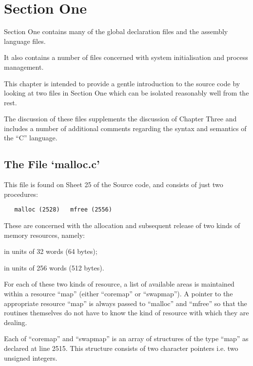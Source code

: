 %
%
\section*{Section One}

{\sf Section One contains many of the global declaration
files and the assembly language files.

It also contains a number of files concerned with
system initialisation and process management.}



This chapter is intended to provide a
gentle introduction to the source code
by looking at two files in Section One
which can be isolated reasonably well
from the rest.


The discussion of these files supplements the discussion of Chapter Three
and includes a number of additional
comments regarding the syntax and
semantics of the ``C'' language.


\subsection{The File `malloc.c'}

This file is found on Sheet 25 of the
Source code, and consists of just two
procedures:

\begin{verbatim}
   malloc (2528)   mfree (2556)
\end{verbatim}


These are concerned with the allocation
and subsequent release of two kinds of
memory resources, namely:

\bd
\item[main memory] in units of 32 words (64 bytes);

\item[disk swap area] in units of 256 words (512 bytes).
\ed

For each of these two kinds of
resource, a list of available areas is
maintained within a resource ``map''
(either ``coremap'' or ``swapmap''). A
pointer to the appropriate resource
``map'' is always passed to ``malloc'' and
``mfree'' so that the routines themselves
do not have to know the kind of
resource with which they are dealing.

Each of ``coremap'' and ``swapmap'' is an
array of structures of the type ``map''
as declared at line 2515. This structure consists of two character pointers
i.e. two unsigned integers.

